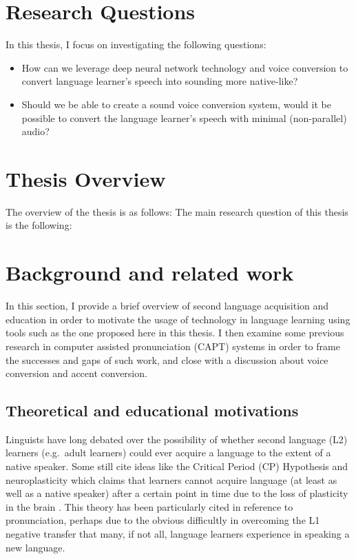 \documentclass
[
    a4paper,
    twoside,
    12pt
]
{report}
\begin{document}
\section{Research Questions}\label{research-questions}

In this thesis, I focus on investigating the following questions:

\begin{itemize}
\item
  How can we leverage deep neural network technology and voice
  conversion to convert language learner's speech into sounding more
  native-like?
\item
  Should we be able to create a sound voice conversion system, would it
  be possible to convert the language learner's speech with minimal
  (non-parallel) audio?
\end{itemize}

\section{Thesis Overview}\label{thesis-overview}

The overview of the thesis is as follows: The main research question of
this thesis is the following:
\section{Background and related work}\label{background-and-related-work}

In this section, I provide a brief overview of second language
acquisition and education in order to motivate the usage of technology
in language learning using tools such as the one proposed here in this
thesis. I then examine some previous research in computer assisted
pronunciation (CAPT) systems in order to frame the successes and gaps of
such work, and close with a discussion about voice conversion and accent
conversion.

\subsection{Theoretical and educational
motivations}\label{theoretical-and-educational-motivations}

\label{sec:theo-edu} Linguists have long debated over the possibility of
whether second language (L2) learners (e.g.~adult learners) could ever
acquire a language to the extent of a native speaker. Some still cite
ideas like the Critical Period (CP) Hypothesis and neuroplasticity which
claims that learners cannot acquire language (at least as well as a
native speaker) after a certain point in time due to the loss of
plasticity in the brain \parencite{lenneberg1967,scovel1988}. This
theory has been particularly cited in reference to pronunciation,
perhaps due to the obvious difficultly in overcoming the L1 negative
transfer that many, if not all, language learners experience in speaking
a new language.
\end{document}
